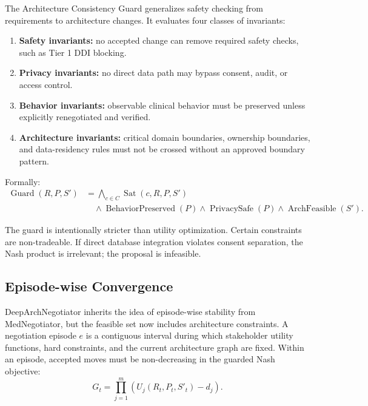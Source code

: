 \documentclass[english,preprint,nonatbib]{elsarticle}
\begin{document}
The Architecture Consistency Guard generalizes safety checking from requirements to architecture changes.
It evaluates four classes of invariants:

\begin{enumerate}[leftmargin=2em]
  \item \textbf{Safety invariants:} no accepted change can remove required safety checks, such as Tier 1 DDI blocking.
  \item \textbf{Privacy invariants:} no direct data path may bypass consent, audit, or access control.
  \item \textbf{Behavior invariants:} observable clinical behavior must be preserved unless explicitly renegotiated and verified.
  \item \textbf{Architecture invariants:} critical domain boundaries, ownership boundaries, and data-residency rules must not be crossed without an approved boundary pattern.
\end{enumerate}

Formally:
\begin{equation}
\begin{aligned}
\operatorname{Guard}(R,P,S')
&=
\bigwedge_{c \in C}
\operatorname{Sat}(c,R,P,S') \\
&\quad \land
\operatorname{BehaviorPreserved}(P)
\land
\operatorname{PrivacySafe}(P)
\land
\operatorname{ArchFeasible}(S').
\end{aligned}
\end{equation}

The guard is intentionally stricter than utility optimization.
Certain constraints are non-tradeable.
If direct database integration violates consent separation, the Nash product is irrelevant; the proposal is infeasible.

\subsection{Episode-wise Convergence}

DeepArchNegotiator inherits the idea of episode-wise stability from MedNegotiator, but the feasible set now includes architecture constraints.
A negotiation episode $e$ is a contiguous interval during which stakeholder utility functions, hard constraints, and the current architecture graph are fixed.
Within an episode, accepted moves must be non-decreasing in the guarded Nash objective:
\begin{equation}
    G_t = \prod_{j=1}^{m}(U_j(R_t,P_t,S'_t)-d_j).
\end{equation}
\end{document}
